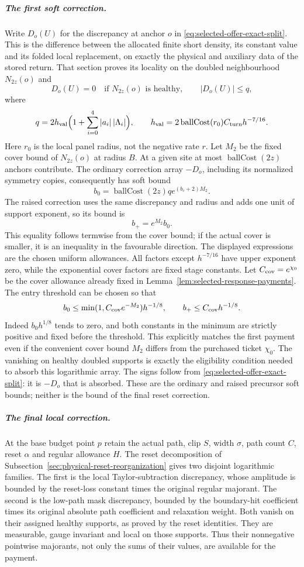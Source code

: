 \subparagraph{The first soft correction.}
Write $D_o(U)$ for the discrepancy at anchor $o$ in
\eqref{eq:selected-offer-exact-split}. This is the difference between
the allocated finite short density, its constant value and its folded
local replacement, on exactly the physical and auxiliary data of the
stored return. That section proves its locality on the doubled
neighbourhood $N_{2z}(o)$ and
\[
 D_o(U)=0\quad\text{if }N_{2z}(o)\text{ is healthy},\qquad
 |D_o(U)|\le q,
\]
where
\[
 q=2h_{\rm val}\Bigl(1+\sum_{i=0}^4|a_i|\,|\Lambda_i|\Bigr),
 \qquad h_{\rm val}=2\operatorname{ballCost}(r_0)
                              C_{\rm turn}h^{-7/16}.
\]
Here $r_0$ is the local panel radius, not the negative rate $r$.
Let $M_2$ be the fixed cover bound of $N_{2z}(o)$ at radius $B$.
At a given site at most $\operatorname{ballCost}(2z)$ anchors
contribute. The ordinary correction array $-D_o$, including its
normalized symmetry copies, consequently has soft bound
\[
 b_0=\operatorname{ballCost}(2z)q e^{(b_c+2)M_2}.
\]
The raised correction uses the same discrepancy and radius and adds
one unit of support exponent, so its bound is
\[
                         b_+=e^{M_2}b_0.
\]
This equality follows termwise from the cover bound; if the actual
cover is smaller, it is an inequality in the favourable direction.
The displayed expressions are the chosen uniform allowances.
All factors except $h^{-7/16}$ have upper exponent zero, while the
exponential cover factors are fixed stage constants. Let $C_{\rm cov}=e^{\chi_0}$ be the cover allowance already
fixed in Lemma~\ref{lem:selected-response-payments}. The entry
threshold can be chosen so that
\[
 b_0\le\min(1,C_{\rm cov}e^{-M_2})h^{-1/8},
 \qquad b_+\le C_{\rm cov}h^{-1/8}.
\]
Indeed $b_0h^{1/8}$ tends to zero, and both constants in the
minimum are strictly positive and fixed before the threshold.
This explicitly matches the first payment even if the convenient
cover bound $M_2$ differs from the purchased ticket $\chi_0$.
The vanishing on healthy doubled supports is exactly the eligibility
condition needed to absorb this logarithmic array. The signs follow
from \eqref{eq:selected-offer-exact-split}: it is $-D_o$ that is
absorbed. These are the ordinary and raised precursor soft bounds;
neither is the bound of the final reset correction.

\subparagraph{The final local correction.}
At the base budget point $p$ retain the actual path, clip $S$, width
$\sigma$, path count $C$, reset $\alpha$ and regular allowance $H$.
The reset decomposition of
Subsection~\ref{sec:physical-reset-reorganization} gives two disjoint
logarithmic families. The first is the local Taylor-subtraction
discrepancy, whose amplitude is bounded by the reset-loss constant
times the original regular majorant. The second is the low-path
mask discrepancy, bounded by the boundary-hit coefficient times
its original absolute path coefficient and relaxation weight.
Both vanish on their assigned healthy supports, as proved by the
reset identities. They are measurable, gauge invariant and local
on those supports. Thus their nonnegative pointwise majorants,
not only the sums of their values, are available for the payment.

